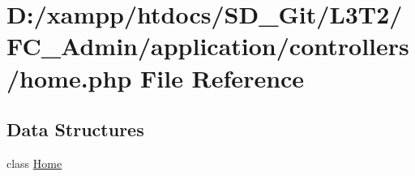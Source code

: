 \hypertarget{_admin_2application_2controllers_2_home_8php}{}\section{D\+:/xampp/htdocs/\+S\+D\+\_\+\+Git/\+L3\+T2/\+F\+C\+\_\+\+Admin/application/controllers/home.php File Reference}
\label{_admin_2application_2controllers_2_home_8php}
\subsection*{Data Structures}
\begin{DoxyCompactItemize}
\item 
class \hyperlink{class_home}{Home}
\end{DoxyCompactItemize}
